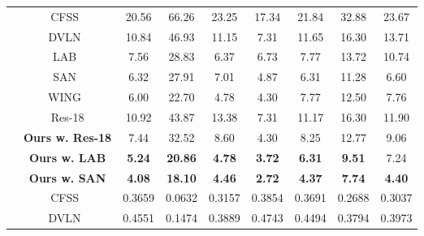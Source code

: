 \documentclass[10pt,twocolumn,letterpaper]{article}
\begin{document}
\begin{table*}[htb]
\begin{center}
{\begin{tabular}{c|c|c|c|c|c|c|c|c}
\Xhline{1.1pt}
\multirow{11}{*}{Failure Rate (\%)} & CFSS~\cite{CFSS}  & 20.56           & 66.26           & 23.25           & 17.34           & 21.84           & 32.88           & 23.67            \\
                                   & DVLN~\cite{DVLN}  & 10.84           & 46.93           & 11.15           & 7.31            & 11.65           & 16.30           & 13.71            \\
                                   & LAB~\cite{LAB}                    & 7.56            & 28.83           & 6.37            & 6.73            & 7.77            & 13.72           & 10.74            \\
                                   & SAN~\cite{SAN}                    & 6.32            & 27.91           & 7.01            & 4.87            & 6.31            & 11.28           & 6.60             \\
                                   & WING~\cite{feng2018wing}                   & 6.00            & 22.70           & 4.78            & 4.30            & 7.77            & 12.50           & 7.76             \\ 
                                   & Res-18                 & 10.92           & 43.87           & 13.38           & 7.31            & 11.17           & 16.30           & 11.90            \\
\cline{2-9}
                                   & \textbf{Ours w. Res-18} & 7.44            & 32.52           & 8.60            & 4.30            & 8.25            & 12.77           & 9.06             \\
                                   & \textbf{Ours w. LAB}    & \textbf{5.24}   & \textbf{20.86}  & \textbf{4.78}   & \textbf{3.72}   & \textbf{6.31}   & \textbf{9.51}   & 7.24             \\
                                   & \textbf{Ours w. SAN}    & \textbf{4.08}   & \textbf{18.10}  & \textbf{4.46}   & \textbf{2.72}   & \textbf{4.37}   & \textbf{7.74}   & \textbf{4.40}    \\ 
\Xhline{1.1pt}
\multirow{11}{*}{AUC @0.1}         & CFSS~\cite{CFSS}  & 0.3659          & 0.0632          & 0.3157          & 0.3854          & 0.3691          & 0.2688          & 0.3037           \\
                                   & DVLN~\cite{DVLN}  & 0.4551          & 0.1474          & 0.3889          & 0.4743          & 0.4494          & 0.3794          & 0.3973           \\

\end{tabular}}
\end{center}
\end{table*}
\end{document}
